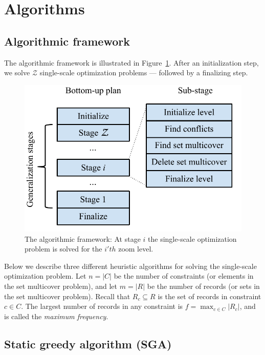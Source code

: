 \section{Algorithms}
\label{sec:algorithms}

\subsection{Algorithmic framework}

The algorithmic framework is illustrated in Figure~\ref{fig:algorithmic-framework}. After an initialization step, we solve $\mathcal{Z}$ single-scale optimization problems --- followed by a finalizing step.

\begin{figure}[htbp]
\begin{center}
\includegraphics[scale=.6]{figs/cvl_stages.pdf}
\caption{The algorithmic framework: At stage $i$ the single-scale optimization problem is solved for the $i'th$ zoom level.}
\label{fig:algorithmic-framework}
\end{center}
\end{figure}

Below we describe three different heuristic algorithms for solving the single-scale optimization problem. Let $n=|C|$ be the number of constraints (or elements in the set multicover problem), and let $m=|R|$ be the number of records (or sets in the set multicover problem). Recall that $R_c \subseteq R$ is the set of records in constraint $c \in C$. The largest number of records in any constraint is $f = \max_{c \in C} |R_c|$, and is called the \emph{maximum frequency}.

\subsection{Static greedy algorithm (SGA)}


